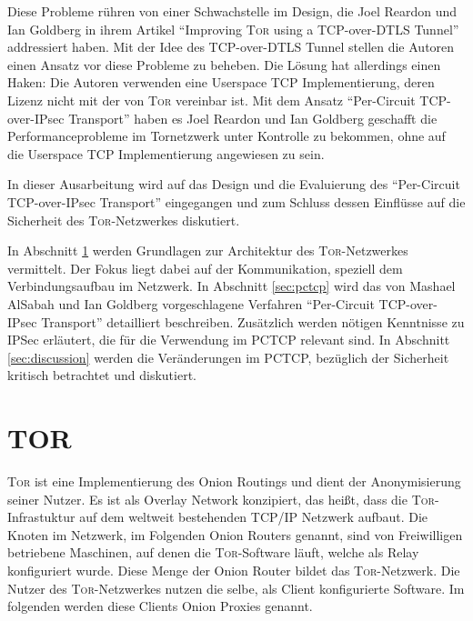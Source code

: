 \documentclass[fleqn,envcountsame,runningheads,10pt,a4paper]{llncs}
\begin{document}
Diese Probleme rühren von einer Schwachstelle im Design, die Joel Reardon und Ian Goldberg in ihrem Artikel ``Improving \textsc{Tor} using a TCP-over-DTLS Tunnel'' addressiert haben. Mit der Idee des TCP-over-DTLS Tunnel stellen die Autoren einen Ansatz vor diese Probleme zu beheben. Die Lösung hat allerdings einen Haken: Die Autoren verwenden eine Userspace TCP Implementierung, deren Lizenz nicht mit der von \textsc{Tor} vereinbar ist. Mit dem Ansatz ``Per-Circuit TCP-over-IPsec Transport'' haben es Joel Reardon und Ian Goldberg geschafft die Performanceprobleme im Tornetzwerk unter Kontrolle zu bekommen, ohne auf die Userspace TCP Implementierung angewiesen zu sein.

In dieser Ausarbeitung wird auf das Design und die Evaluierung des ``Per-Circuit TCP-over-IPsec Transport'' eingegangen und zum Schluss dessen Einflüsse auf die Sicherheit des \textsc{Tor}-Netzwerkes diskutiert.

In Abschnitt \ref{sec:tor} werden Grundlagen zur Architektur des \textsc{Tor}-Netzwerkes vermittelt.
Der Fokus liegt dabei auf der Kommunikation, speziell dem Verbindungsaufbau im Netzwerk.
In Abschnitt \ref{sec:pctcp} wird das von Mashael AlSabah und Ian Goldberg vorgeschlagene Verfahren ``Per-Circuit TCP-over-IPsec Transport'' detailliert beschreiben.
Zusätzlich werden nötigen Kenntnisse zu IPSec erläutert, die für die Verwendung im PCTCP relevant sind.
In Abschnitt \ref{sec:discussion} werden die Veränderungen im PCTCP, bezüglich der Sicherheit kritisch betrachtet und diskutiert.

\section{TOR}
\label{sec:tor}



\textsc{Tor} ist eine Implementierung des Onion Routings und dient der Anonymisierung seiner Nutzer.
Es ist als Overlay Network konzipiert, das heißt, dass die \textsc{Tor}-Infrastuktur auf dem weltweit bestehenden TCP/IP Netzwerk aufbaut.
Die Knoten im Netzwerk, im Folgenden Onion Routers genannt, sind von Freiwilligen betriebene Maschinen, auf denen die \textsc{Tor}-Software läuft, welche als Relay konfiguriert wurde.
Diese Menge der Onion Router bildet das \textsc{Tor}-Netzwerk.
Die Nutzer des \textsc{Tor}-Netzwerkes nutzen die selbe, als Client konfigurierte Software.
Im folgenden werden diese Clients Onion Proxies genannt.
\end{document}

